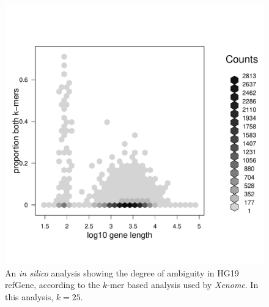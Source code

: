 \documentclass{bioinfo}
\newcommand{\Xenome}{\textit{Xenome}{}}
\begin{document}
\begin{figure}
\includegraphics[scale=0.5]{both.pdf}
\caption{An \textit{in silico} analysis showing the degree of ambiguity in
HG19 refGene, according to the $k$-mer based analysis used by \Xenome. In
this analysis, $k = 25$.}
\label{fig:both}
\end{figure}
\end{document}
